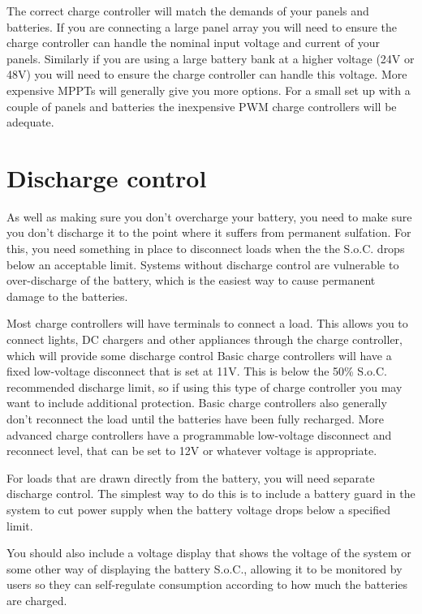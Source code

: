 \documentclass{article}
\theoremstyle{definition}
\theoremstyle{definition}
\theoremstyle{remark}
\begin{document}
    The correct charge controller will match the demands of your panels and batteries. If you are connecting a large panel array you will need to ensure the charge controller can handle the nominal input voltage and current of your panels. Similarly if you are using a large battery bank at a higher voltage (24V or 48V) you will need to ensure the charge controller can handle this voltage. More expensive MPPTs will generally give you more options. For a small set up with a couple of panels and batteries the inexpensive PWM charge controllers will be adequate. 
  


\section{Discharge control} %
\label{sec:discharge_control}

  As well as making sure you don’t overcharge your battery, you need to make sure you don’t discharge it to the point where it suffers from permanent sulfation. For this, you need something in place to disconnect loads when the the S.o.C. drops below an acceptable limit. Systems without discharge control are vulnerable to over-discharge of the battery, which is the easiest way to cause permanent damage to the batteries.

  Most charge controllers will have terminals to connect a load. This allows you to connect lights, DC chargers and other appliances through the charge controller, which will provide some discharge control Basic charge controllers will have a fixed low-voltage disconnect that is set at 11V. This is below the 50\% S.o.C. recommended discharge limit, so if using this type of charge controller you may want to include additional protection. Basic charge controllers also generally don't reconnect the load until the batteries have been fully recharged. More advanced charge controllers have a programmable low-voltage disconnect and reconnect level, that can be set to 12V or whatever voltage is appropriate.

  For loads that are drawn directly from the battery, you will need separate discharge control. The simplest way to do this is to include a battery guard in the system to cut power supply when the battery voltage drops below a specified limit. 

  You should also include a voltage display that shows the voltage of the system or some other way of displaying the battery S.o.C., allowing it to be monitored by users so they can self-regulate consumption according to how much the batteries are charged.
\end{document}
